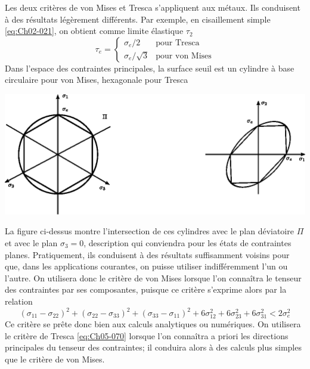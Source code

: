 Les deux critères de von Mises et Tresca s'appliquent aux métaux.
Ils conduisent à des résultats légèrement différents.
Par exemple, en cisaillement simple \eqref{eq:Ch02-021}, on obtient comme limite élastique $\tau_2$
\begin{equation}
    \tau_e = 
    \begin{cases}
        \sigma_e /2 & \text{pour Tresca} \\
        \sigma_e /\sqrt{3} & \text{pour von Mises}
    \end{cases}
    \label{eq:Ch05-071}
\end{equation}
Dans l'espace des contraintes principales, la surface seuil est un cylindre à base circulaire pour von Mises, hexagonale pour Tresca 
\begin{center}
    \includegraphics{../images/T1_Ch05-06}
\end{center}
La figure ci-dessus montre l'intersection de ces cylindres avec le plan déviatoire $\Pi$ et avec le plan $\sigma_3=0$, description qui conviendra pour les états de contraintes planes.
Pratiquement, ils conduisent à des résultats suffisamment voisins pour que, dans les applications courantes, on puisse utiliser indifféremment l'un ou l'autre.
On utilisera donc le critère de von Mises lorsque l'on connaîtra le tenseur des contraintes par ses composantes, puisque ce critère s'exprime alors par la relation 
\begin{equation}
    \left( \sigma_{11} - \sigma_{22} \right)^2 + \left( \sigma_{22} - \sigma_{33} \right)^2 + \left( \sigma_{33} - \sigma_{11} \right)^2 + 6\sigma_{12}^2 + 6 \sigma_{23}^2 + 6\sigma_{31}^2 < 2 \sigma_e^2
    \label{eq:Ch05-072}
\end{equation}
Ce critère se prête donc bien aux calculs analytiques ou numériques.
On utilisera le critère de Tresca \eqref{eq:Ch05-070} lorsque l'on connaîtra a priori les directions principales du tenseur des contraintes; il conduira alors à des calculs plus simples que le critère de von Mises. 
